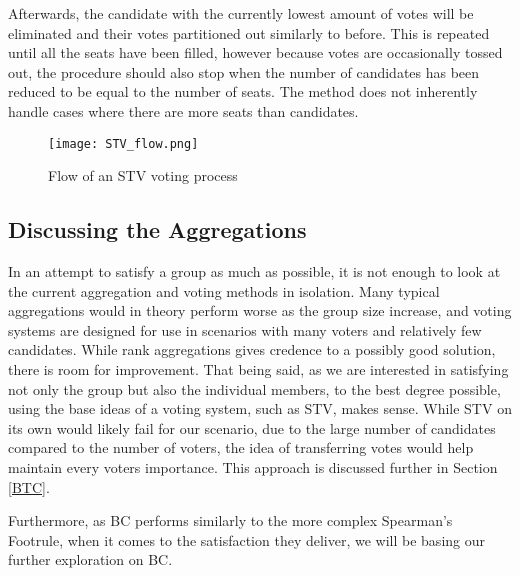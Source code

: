 Afterwards, the candidate with the currently lowest amount of votes will be eliminated and their votes partitioned out similarly to before. This is repeated until all the seats have been filled, however because votes are occasionally tossed out, the procedure should also stop when the number of candidates has been reduced to be equal to the number of seats. The method does not inherently handle cases where there are more seats than candidates.

\begin{figure}
	\centering
	\texttt{[image: STV\_flow.png]}
	\caption{Flow of an STV voting process}
	\label{fig:stvflow}
\end{figure}


\subsection{Discussing the Aggregations}
In an attempt to satisfy a group as much as possible, it is not enough to look at the current aggregation and voting methods in isolation. Many typical aggregations would in theory perform worse as the group size increase, and voting systems are designed for use in scenarios with many voters and relatively few candidates. While rank aggregations gives credence to a possibly good solution, there is room for improvement. That being said, as we are interested in satisfying not only the group but also the individual members, to the best degree possible, using the base ideas of a voting system, such as STV, makes sense. While STV on its own would likely fail for our scenario, due to the large number of candidates compared to the number of voters, the idea of transferring votes would help maintain every voters importance. This approach is discussed further in Section \ref{BTC}.

Furthermore, as BC performs similarly to the more complex Spearman's Footrule, when it comes to the satisfaction they deliver, we will be basing our further exploration on BC\cite{baltrunas}.